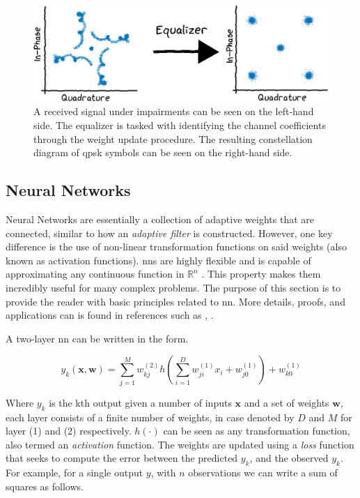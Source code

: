\begin{figure}
    \centering
    \includegraphics[width=\textwidth]{chapters/part_pathloss/figures/equalizer_example.eps}
    \caption{A received signal under impairments can be seen on the left-hand side. The equalizer is tasked with identifying the channel coefficients through the weight update procedure. The resulting constellation diagram of \gls{qpsk} symbols can be seen on the right-hand side. }
    \label{fig:equalizer_example}
\end{figure}

\subsection{Neural Networks}\label{sec:neural_networks}

Neural Networks are essentially a collection of adaptive weights that are connected, similar to how an \emph{adaptive filter} is constructed. However, one key difference is the use of non-linear transformation functions on said weights (also known as activation functions). \glspl{nn} are highly flexible and is capable of approximating any continuous function in $\mathbb{R}^n$ \cite{Nielsen2015}. This property makes them incredibly useful for many complex problems. The purpose of this section is to provide the reader with basic principles related to \gls{nn}. More details, proofs, and applications can is found in references such as \cite{Nielsen2015}, \cite{M.Bishop2006}.

A two-layer \gls{nn} can be written in the form.

\begin{equation}\label{eq:neural_network}
  y_k(\mathbf{x},\mathbf{w}) = \sum_{j=1}^M w_{kj}^{(2)} h\left( \sum_{i=1}^D w_{ji}^{(1)}x_i+w_{j0}^{(1)} \right) +w_{k0}^{(1)}
\end{equation}

Where $y_k$ is the kth output given a number of inputs $\mathbf{x}$ and a set of weights $\mathbf{w}$, each layer consists of a finite number of weights, in case denoted by $D$ and $M$ for layer (1) and (2) respectively. $h(\cdot)$ can be seen as any transformation function, also termed an \emph{activation} function. The weights are updated using a \emph{loss} function that seeks to compute the error between the predicted $y_k$, and the observed $y_k$. For example, for a single output $y$, with $n$ observations we can write a sum of squares as follows.


